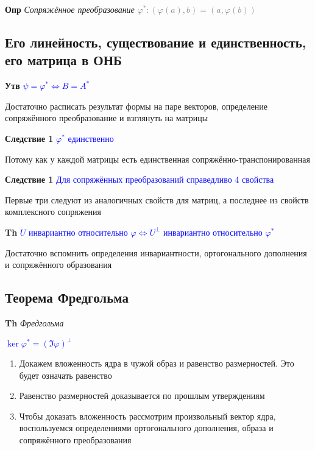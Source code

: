 \documentclass[a4paper, 14pt]{article}
\begin{document}
    \textbf{Опр} \textit{Сопряжённое преобразование} \textcolor{gray}{$\varphi^*: (\varphi(a), b) = (a, \varphi(b))$}
    
    \subsection{Его линейность, существование и единственность, его матрица в ОНБ}

    
    \textbf{Утв} \textcolor{blue}{$\psi = \varphi^* \Leftrightarrow B = A^*$}
    
    Достаточно расписать результат формы на паре векторов, определение сопряжённого преобразование и взглянуть на
    матрицы
    
    \textbf{Следствие 1} \textcolor{blue}{$\varphi^*$ единственно}
    
    Потому как у каждой матрицы есть единственная сопряжённо-транспонированная
    
    \textbf{Следствие 1} \textcolor{blue}{Для сопряжённых преобразований справедливо 4 свойства}
    
    Первые три следуют из аналогичных свойств для матриц, а последнее из свойств комплексного сопряжения
    
    \textbf{Th} \textcolor{blue}{$U$ инвариантно относительно $\varphi \Leftrightarrow U^\bot$ инвариантно
    относительно $\varphi^*$}
    
    Достаточно вспомнить определения инвариантности, ортогонального дополнения и сопряжённого образования
    
    \subsection{Теорема Фредгольма}
    
    \textbf{Th} \textit{Фредгольма}
    
    \textcolor{blue}{$\ker \varphi^* = (\Im \varphi)^\bot$}
    
    \begin{enumerate}
        \item Докажем вложенность ядра в чужой образ и равенство размерностей.
        Это будет означать равенство
        \item Равенство размерностей доказывается по прошлым утверждениям
        \item Чтобы доказать вложенность рассмотрим произвольный вектор ядра, воспользуемся определениями
        ортогонального дополнения, образа и сопряжённого преобразования
    \end{enumerate}
    
\end{document}
